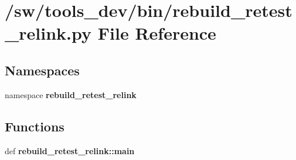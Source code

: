 \section{/sw/tools\_\-dev/bin/rebuild\_\-retest\_\-relink.py File Reference}
\label{rebuild__retest__relink_8py}
\subsection*{Namespaces}
\begin{CompactItemize}
\item 
namespace {\bf rebuild\_\-retest\_\-relink}
\end{CompactItemize}
\subsection*{Functions}
\begin{CompactItemize}
\item 
def {\bf rebuild\_\-retest\_\-relink::main}
\end{CompactItemize}
